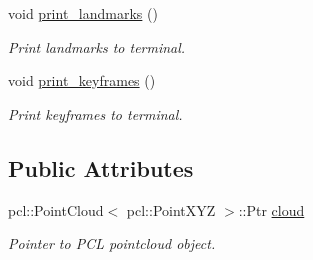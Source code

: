 \begin{DoxyCompactItemize}
\mbox{\label{classMap_a32152c9ee2de6b6a71ba58dd365079ba}} 
void \hyperlink{classMap_a32152c9ee2de6b6a71ba58dd365079ba}{print\+\_\+landmarks} ()
\begin{DoxyCompactList}\small\item\em Print landmarks to terminal. \end{DoxyCompactList}\item 
\mbox{\label{classMap_ad1d96561dbffb346907123260fb0e45e}} 
void \hyperlink{classMap_ad1d96561dbffb346907123260fb0e45e}{print\+\_\+keyframes} ()
\begin{DoxyCompactList}\small\item\em Print keyframes to terminal. \end{DoxyCompactList}\end{DoxyCompactItemize}
\subsection*{Public Attributes}
\begin{DoxyCompactItemize}
\item 
\mbox{\label{classMap_aace3b377aebfad95cc2f3a90cd5ea42d}} 
pcl\+::\+Point\+Cloud$<$ pcl\+::\+Point\+X\+YZ $>$\+::Ptr \hyperlink{classMap_aace3b377aebfad95cc2f3a90cd5ea42d}{cloud}
\begin{DoxyCompactList}\small\item\em Pointer to P\+CL pointcloud object. \end{DoxyCompactList}\end{DoxyCompactItemize}
